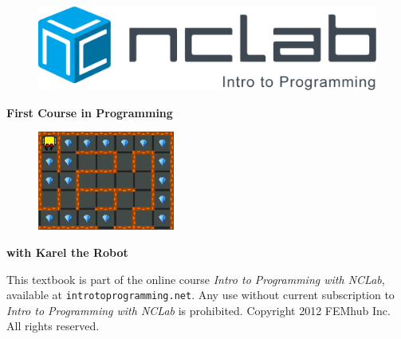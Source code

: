 \documentclass[article,A4,12pt]{llncs}
\begin{document}

\pagestyle{empty}

\begin{figure}[!ht]
\begin{center}
\includegraphics[width=\textwidth]{img/NCLab-Programming-1.png}
\end{center}
\end{figure}

\vspace{1.5cm}

\begin{center}
{\huge \bf First Course in Programming}
\end{center}

\begin{figure}[!ht]
\begin{center}
\vspace{-6mm}
\includegraphics[width=0.4\textwidth]{img/karel-logo.png}
\vbox{}
\vspace{-9mm}
\end{center}
\end{figure}
\begin{center}
{\huge \bf with Karel the Robot}
\end{center}
\vbox{}
\vfill
\begin{center}
This textbook is part of the online course {\em Intro to Programming with NCLab},
available at {\tt introtoprogramming.net}. Any use without current subscription 
to {\em Intro to Programming with NCLab} is prohibited.
Copyright 2012 FEMhub Inc. All rights reserved.
\end{center}
\newpage
\noindent
\end{document}
